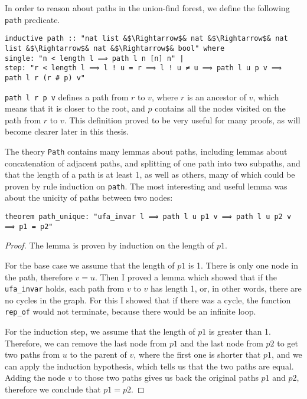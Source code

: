 In order to reason about paths in the union-find forest, we define the following \lstinline{path} predicate.

\begin{lstlisting}
inductive path :: "nat list &$\Rightarrow$& nat &$\Rightarrow$& nat list &$\Rightarrow$& nat &$\Rightarrow$& bool" where
single: "n < length l ⟹ path l n [n] n" |
step: "r < length l ⟹ l ! u = r ⟹ l ! u ≠ u ⟹ path l u p v ⟹ path l r (r # p) v"
\end{lstlisting}

\lstinline{path l r p v} defines a path from $r$ to $v$, where $r$ is an ancestor of $v$, which means that it is closer to the root, and $p$ contains all the nodes visited on the path from $r$ to $v$. This definition proved to be very useful for many proofs, as will become clearer later in this thesis.

The theory \lstinline{Path} contains many lemmas about paths, including lemmas about concatenation of adjacent paths, and splitting of one path into two subpaths, and that the length of a path is at least 1, as well as others, many of which could be proven by rule induction on \lstinline{path}. The most interesting and useful lemma was about the unicity of paths between two nodes:

\begin{lstlisting}
theorem path_unique: "ufa_invar l ⟹ path l u p1 v ⟹ path l u p2 v ⟹ p1 = p2"
\end{lstlisting}

\begin{proof}
The lemma is proven by induction on the length of $p1$.

For the base case we assume that the length of $p1$ is 1. There is only one node in the path, therefore $v = u$. Then I proved a lemma which showed that if the \lstinline{ufa_invar} holds, each path from $v$ to $v$ has length 1, or, in other words, there are no cycles in the graph. For this I showed that if there was a cycle, the function \lstinline{rep_of} would not terminate, because there would be an infinite loop.

For the induction step, we assume that the length of $p1$ is greater than 1. Therefore, we can remove the last node from $p1$ and the last node from $p2$ to get two paths from $u$ to the parent of $v$, where the first one is shorter that $p1$, and we can apply the induction hypothesis, which tells us that the two paths are equal. Adding the node $v$ to those two paths gives us back the original paths $p1$ and $p2$, therefore we conclude that $p1 = p2$.
\end{proof}

